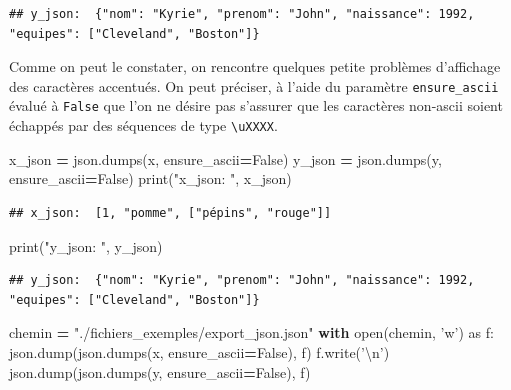 \documentclass[12pt,]{book}
\newenvironment{Shaded}{\begin{snugshade}}{\end{snugshade}}
\newcommand{\CharTok}[1]{\textcolor[rgb]{0.31,0.60,0.02}{#1}}
\newcommand{\StringTok}[1]{\textcolor[rgb]{0.31,0.60,0.02}{#1}}
\newcommand{\ImportTok}[1]{#1}
\newcommand{\VariableTok}[1]{\textcolor[rgb]{0.00,0.00,0.00}{#1}}
\newcommand{\ControlFlowTok}[1]{\textcolor[rgb]{0.13,0.29,0.53}{\textbf{#1}}}
\newcommand{\OperatorTok}[1]{\textcolor[rgb]{0.81,0.36,0.00}{\textbf{#1}}}
\newcommand{\BuiltInTok}[1]{#1}
\newcommand{\NormalTok}[1]{#1}
\numberwithin{equation}{section}
\numberwithin{countremarque}{section}
\begin{document}
\begin{lstlisting}
## y_json:  {"nom": "Kyrie", "prenom": "John", "naissance": 1992, "equipes": ["Cleveland", "Boston"]}
\end{lstlisting}

Comme on peut le constater, on rencontre quelques petite problèmes
d'affichage des caractères accentués. On peut préciser, à l'aide du
paramètre \texttt{ensure\_ascii} évalué à \texttt{False} que l'on ne
désire pas s'assurer que les caractères non-ascii soient échappés par
des séquences de type \texttt{\textbackslash{}uXXXX}.

\begin{Shaded}
\begin{Highlighting}[]
\NormalTok{x_json }\OperatorTok{=}\NormalTok{ json.dumps(x, ensure_ascii}\OperatorTok{=}\VariableTok{False}\NormalTok{)}
\NormalTok{y_json }\OperatorTok{=}\NormalTok{ json.dumps(y, ensure_ascii}\OperatorTok{=}\VariableTok{False}\NormalTok{)}
\BuiltInTok{print}\NormalTok{(}\StringTok{"x_json: "}\NormalTok{, x_json)}
\end{Highlighting}
\end{Shaded}

\begin{lstlisting}
## x_json:  [1, "pomme", ["pépins", "rouge"]]
\end{lstlisting}

\begin{Shaded}
\begin{Highlighting}[]
\BuiltInTok{print}\NormalTok{(}\StringTok{"y_json: "}\NormalTok{, y_json)}
\end{Highlighting}
\end{Shaded}

\begin{lstlisting}
## y_json:  {"nom": "Kyrie", "prenom": "John", "naissance": 1992, "equipes": ["Cleveland", "Boston"]}
\end{lstlisting}

\begin{Shaded}
\begin{Highlighting}[]
\NormalTok{chemin }\OperatorTok{=} \StringTok{"./fichiers_exemples/export_json.json"}
\ControlFlowTok{with} \BuiltInTok{open}\NormalTok{(chemin, }\StringTok{'w'}\NormalTok{) }\ImportTok{as}\NormalTok{ f:}
\NormalTok{    json.dump(json.dumps(x, ensure_ascii}\OperatorTok{=}\VariableTok{False}\NormalTok{), f)}
\NormalTok{    f.write(}\StringTok{'}\CharTok{\textbackslash{}n}\StringTok{'}\NormalTok{)}
\NormalTok{    json.dump(json.dumps(y, ensure_ascii}\OperatorTok{=}\VariableTok{False}\NormalTok{), f)}
\end{Highlighting}
\end{Shaded}
\end{document}
